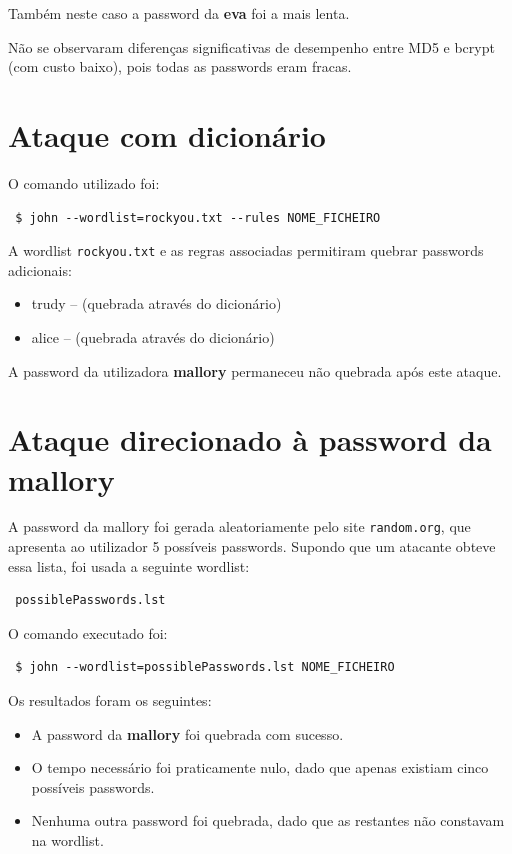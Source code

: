 Também neste caso a password da \textbf{eva} foi a mais lenta.

Não se observaram diferenças significativas de desempenho entre MD5 e bcrypt (com custo baixo), pois todas as passwords eram fracas.

\section{Ataque com dicionário}

O comando utilizado foi: \begin{verbatim} $ john --wordlist=rockyou.txt --rules NOME_FICHEIRO \end{verbatim}

A wordlist \texttt{rockyou.txt} e as regras associadas permitiram quebrar passwords adicionais: \begin{itemize} \item trudy -- (quebrada através do dicionário) \item alice -- (quebrada através do dicionário) \end{itemize}

A password da utilizadora \textbf{mallory} permaneceu não quebrada após este ataque.

\section{Ataque direcionado à password da mallory}

A password da mallory foi gerada aleatoriamente pelo site \texttt{random.org}, que apresenta ao utilizador 5 possíveis passwords. Supondo que um atacante obteve essa lista, foi usada a seguinte wordlist: \begin{verbatim} possiblePasswords.lst \end{verbatim}

O comando executado foi: \begin{verbatim} $ john --wordlist=possiblePasswords.lst NOME_FICHEIRO \end{verbatim}

Os resultados foram os seguintes: \begin{itemize} \item A password da \textbf{mallory} foi quebrada com sucesso. \item O tempo necessário foi praticamente nulo, dado que apenas existiam cinco possíveis passwords. \item Nenhuma outra password foi quebrada, dado que as restantes não constavam na wordlist. \end{itemize}

